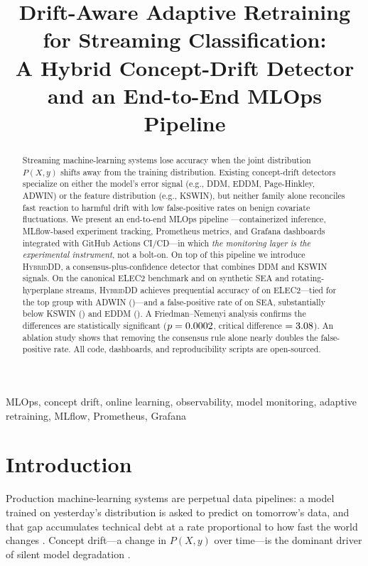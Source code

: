 \documentclass[conference]{IEEEtran}
\title{Drift-Aware Adaptive Retraining for Streaming Classification:\\
A Hybrid Concept-Drift Detector and an End-to-End MLOps Pipeline}
\author{
  \IEEEauthorblockN{Shahmir Asif}
  \IEEEauthorblockA{22i-1883 \\
    FAST-NUCES, Islamabad \\
    \texttt{i221883@nu.edu.pk}}
\and
  \IEEEauthorblockN{AbuBakr}
  \IEEEauthorblockA{22i-1934 \\
    FAST-NUCES, Islamabad \\
    \texttt{i221934@nu.edu.pk}}
\and
  \IEEEauthorblockN{Zaid}
  \IEEEauthorblockA{FAST-NUCES, Islamabad \\
    \texttt{zaid@nu.edu.pk}}
}
\begin{document}
\maketitle

\begin{abstract}
Streaming machine-learning systems lose accuracy when the joint distribution
$P(X, y)$ shifts away from the training distribution. Existing concept-drift
detectors specialize on either the model's error signal (e.g., DDM, EDDM,
Page-Hinkley, ADWIN) or the feature distribution (e.g., KSWIN), but neither
family alone reconciles fast reaction to harmful drift with low false-positive
rates on benign covariate fluctuations. We present an end-to-end MLOps pipeline
---containerized inference, MLflow-based experiment tracking, Prometheus
metrics, and Grafana dashboards integrated with GitHub Actions CI/CD---in which
\emph{the monitoring layer is the experimental instrument}, not a bolt-on. On
top of this pipeline we introduce \textsc{HybridDD}, a consensus-plus-confidence
detector that combines DDM and KSWIN signals. On the canonical ELEC2 benchmark
and on synthetic SEA and rotating-hyperplane streams, \textsc{HybridDD} achieves
prequential accuracy of \AccElecHybrid{} on ELEC2---tied for the top group with
ADWIN (\AccElecAdwin{})---and a false-positive rate of \FPHybrid{} on SEA,
substantially below KSWIN (\FPKSWIN) and EDDM (\FPEDDM). A Friedman--Nemenyi
analysis confirms the differences are statistically significant
($p=0.0002$, critical difference $=3.08$). An ablation study shows
that removing the consensus rule alone nearly doubles the false-positive rate.
All code, dashboards, and reproducibility scripts are open-sourced.
\end{abstract}

\begin{IEEEkeywords}
MLOps, concept drift, online learning, observability, model monitoring,
adaptive retraining, MLflow, Prometheus, Grafana
\end{IEEEkeywords}

\section{Introduction}
\label{sec:intro}

Production machine-learning systems are perpetual data pipelines: a model
trained on yesterday's distribution is asked to predict on tomorrow's data,
and that gap accumulates technical debt at a rate proportional to how fast the
world changes \cite{sculley2015hidden, paleyes2022mlops}. Concept drift---a
change in $P(X, y)$ over time---is the dominant driver of silent model
degradation \cite{gama2014survey, lu2018learning, webb2016characterizing}.
\end{document}
